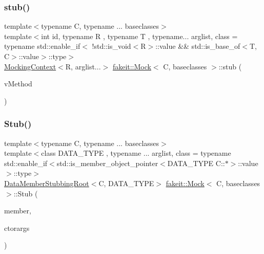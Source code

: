 \mbox{\label{classfakeit_1_1Mock_a6974858200b57469de78bf2a06d6fa02}} 
\subsubsection{\texorpdfstring{stub()}{stub()}\hspace{0.1cm}{\footnotesize\ttfamily [15/72]}}
{\footnotesize\ttfamily template$<$typename C, typename ... baseclasses$>$ \\
template$<$int id, typename R , typename T , typename... arglist, class  = typename std\+::enable\+\_\+if$<$                !std\+::is\+\_\+void$<$\+R$>$\+::value \&\& std\+::is\+\_\+base\+\_\+of$<$\+T, C$>$\+::value$>$\+::type$>$ \\
\mbox{\hyperlink{classfakeit_1_1MockingContext}{Mocking\+Context}}$<$R, arglist...$>$ \mbox{\hyperlink{classfakeit_1_1Mock}{fakeit\+::\+Mock}}$<$ C, baseclasses $>$\+::stub (\begin{DoxyParamCaption}\item[{R(T\+::$\ast$)(arglist...) volatile}]{v\+Method }\end{DoxyParamCaption})\hspace{0.3cm}{\ttfamily [inline]}}

\mbox{\label{classfakeit_1_1Mock_ae210824251ca071933f8a651bbe56047}} 
\subsubsection{\texorpdfstring{Stub()}{Stub()}\hspace{0.1cm}{\footnotesize\ttfamily [5/9]}}
{\footnotesize\ttfamily template$<$typename C, typename ... baseclasses$>$ \\
template$<$class D\+A\+T\+A\+\_\+\+T\+Y\+PE , typename ... arglist, class  = typename std\+::enable\+\_\+if$<$std\+::is\+\_\+member\+\_\+object\+\_\+pointer$<$\+D\+A\+T\+A\+\_\+\+T\+Y\+P\+E C\+::$\ast$$>$\+::value$>$\+::type$>$ \\
\mbox{\hyperlink{classfakeit_1_1DataMemberStubbingRoot}{Data\+Member\+Stubbing\+Root}}$<$C, D\+A\+T\+A\+\_\+\+T\+Y\+PE$>$ \mbox{\hyperlink{classfakeit_1_1Mock}{fakeit\+::\+Mock}}$<$ C, baseclasses $>$\+::Stub (\begin{DoxyParamCaption}\item[{D\+A\+T\+A\+\_\+\+T\+Y\+PE C\+::$\ast$}]{member,  }\item[{const arglist \&...}]{ctorargs }\end{DoxyParamCaption})\hspace{0.3cm}{\ttfamily [inline]}}

